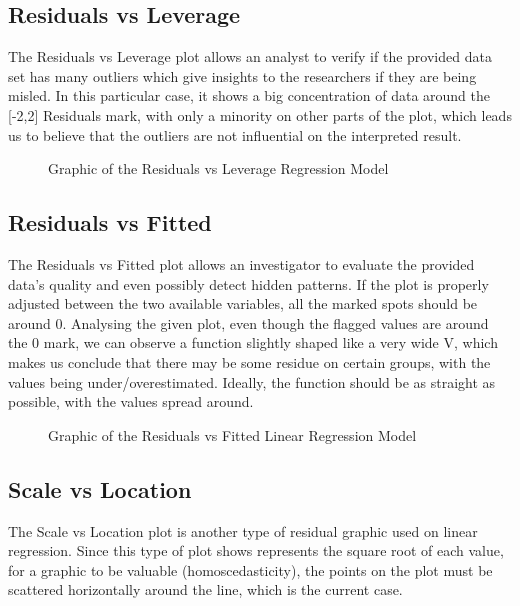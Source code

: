 \documentclass[conference]{IEEEtran}
\begin{document}
\subsection{Residuals vs Leverage}

The Residuals vs Leverage plot allows an analyst to verify if the provided data set has many outliers which give insights to the researchers if they are being misled.
In this particular case, it shows a big concentration of data around the [-2,2] Residuals mark, 
with only a minority on other parts of the plot, which leads us to believe that the outliers are not influential on the interpreted result.

\begin{figure}[H]
    \caption{Graphic of the Residuals vs Leverage Regression Model}
    \label{residualsLeverage}
\end{figure}

\subsection{Residuals vs Fitted}

The Residuals vs Fitted plot allows an investigator to evaluate the provided data's quality and even possibly detect hidden patterns.
If the plot is properly adjusted between the two available variables, all the marked spots should be around 0. Analysing the given plot, even though the flagged values are around the 0 mark, 
we can observe a function slightly shaped like a very wide V, which makes us conclude that there may be some residue on certain groups, with the values being under/overestimated.
Ideally, the function should be as straight as possible, with the values spread around.

\begin{figure}[H]
    \caption{Graphic of the Residuals vs Fitted Linear Regression Model}
    \label{residualsFitted}
\end{figure}

\subsection{Scale vs Location}

The Scale vs Location plot is another type of residual graphic used on linear regression.
Since this type of plot shows represents the square root of each value, for a graphic to be valuable (homoscedasticity), 
the points on the plot must be scattered horizontally around the line, which is the current case.
\end{document}
